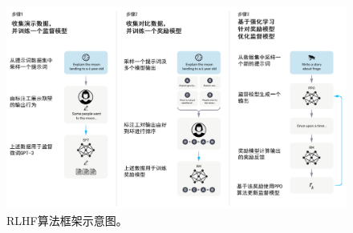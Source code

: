 \begin{figure}[htbp]
	\centering
	\includegraphics[scale=0.5]{Fig/rlhf_framework.png}
	\caption{\label{rlhf_framework}RLHF算法框架示意图\cite{DBLP:conf/nips/Ouyang0JAWMZASR22}。}
\end{figure}

